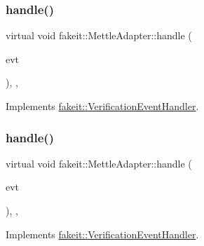 \subsubsection{\texorpdfstring{handle()}{handle()}\hspace{0.1cm}{\footnotesize\ttfamily [2/6]}}
{\footnotesize\ttfamily virtual void fakeit\+::\+Mettle\+Adapter\+::handle (\begin{DoxyParamCaption}\item[{const \mbox{\hyperlink{structfakeit_1_1SequenceVerificationEvent}{Sequence\+Verification\+Event}} \&}]{evt }\end{DoxyParamCaption})\hspace{0.3cm}{\ttfamily [inline]}, {\ttfamily [override]}, {\ttfamily [virtual]}}



Implements \mbox{\hyperlink{structfakeit_1_1VerificationEventHandler_adf355a9888bc2bf78ce0e1219bfb1379}{fakeit\+::\+Verification\+Event\+Handler}}.

\mbox{\label{structfakeit_1_1MettleAdapter_a1256c2d0349a01abb4f0e348c90fc59b}} 
\subsubsection{\texorpdfstring{handle()}{handle()}\hspace{0.1cm}{\footnotesize\ttfamily [3/6]}}
{\footnotesize\ttfamily virtual void fakeit\+::\+Mettle\+Adapter\+::handle (\begin{DoxyParamCaption}\item[{const \mbox{\hyperlink{structfakeit_1_1NoMoreInvocationsVerificationEvent}{No\+More\+Invocations\+Verification\+Event}} \&}]{evt }\end{DoxyParamCaption})\hspace{0.3cm}{\ttfamily [inline]}, {\ttfamily [override]}, {\ttfamily [virtual]}}



Implements \mbox{\hyperlink{structfakeit_1_1VerificationEventHandler_a826b9d15e23bad7013b219d8e45ef1d0}{fakeit\+::\+Verification\+Event\+Handler}}.

\mbox{\label{structfakeit_1_1MettleAdapter_a4abbacb12107084c5382975044282afe}} 
